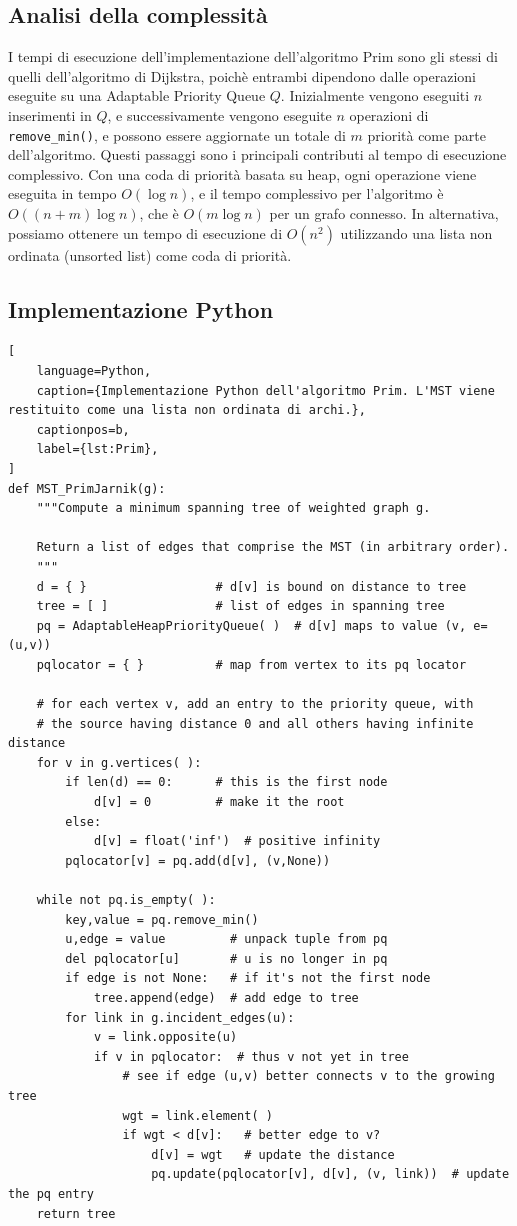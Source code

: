 \subsection*{Analisi della complessità}
I tempi di esecuzione dell'implementazione dell'algoritmo Prim sono gli stessi di quelli dell'algoritmo di Dijkstra, poichè entrambi dipendono dalle operazioni eseguite su una Adaptable Priority Queue $Q$. Inizialmente vengono eseguiti $n$ inserimenti in $Q$, e successivamente vengono eseguite $n$ operazioni di \texttt{remove\_min()}, e possono essere aggiornate un totale di $m$ priorità come parte dell'algoritmo. Questi passaggi sono i principali contributi al tempo di esecuzione complessivo. Con una coda di priorità basata su heap, ogni operazione viene eseguita in tempo $O(\log n)$, e il tempo complessivo per l'algoritmo è $O((n+m) \log n)$, che è $O(m \log n)$ per un grafo connesso. In alternativa, possiamo ottenere un tempo di esecuzione di $O(n^2)$ utilizzando una lista non ordinata (unsorted list) come coda di priorità.


\clearpage
\subsection*{Implementazione Python}
\vspace{2\baselineskip}
\begin{lstlisting}[
    language=Python,
    caption={Implementazione Python dell'algoritmo Prim. L'MST viene restituito come una lista non ordinata di archi.},
    captionpos=b,
    label={lst:Prim},
]
def MST_PrimJarnik(g):
    """Compute a minimum spanning tree of weighted graph g.

    Return a list of edges that comprise the MST (in arbitrary order).
    """
    d = { }                  # d[v] is bound on distance to tree
    tree = [ ]               # list of edges in spanning tree
    pq = AdaptableHeapPriorityQueue( )  # d[v] maps to value (v, e=(u,v))
    pqlocator = { }          # map from vertex to its pq locator

    # for each vertex v, add an entry to the priority queue, with
    # the source having distance 0 and all others having infinite distance
    for v in g.vertices( ):
        if len(d) == 0:      # this is the first node
            d[v] = 0         # make it the root
        else:
            d[v] = float('inf')  # positive infinity
        pqlocator[v] = pq.add(d[v], (v,None))

    while not pq.is_empty( ):
        key,value = pq.remove_min()
        u,edge = value         # unpack tuple from pq
        del pqlocator[u]       # u is no longer in pq
        if edge is not None:   # if it's not the first node
            tree.append(edge)  # add edge to tree
        for link in g.incident_edges(u):
            v = link.opposite(u)
            if v in pqlocator:  # thus v not yet in tree
                # see if edge (u,v) better connects v to the growing tree
                wgt = link.element( )
                if wgt < d[v]:   # better edge to v?
                    d[v] = wgt   # update the distance
                    pq.update(pqlocator[v], d[v], (v, link))  # update the pq entry
    return tree
\end{lstlisting}

